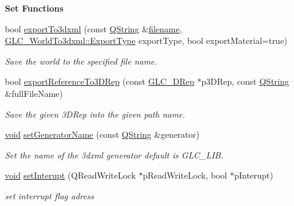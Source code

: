 \begin{Indent}{\bf Set Functions}\par
\begin{DoxyCompactItemize}
\item 
bool \hyperlink{class_g_l_c___world_to3dxml_afc36c19b69c9afedb9d76f64194a0282}{export\-To3dxml} (const \hyperlink{group___u_a_v_objects_plugin_gab9d252f49c333c94a72f97ce3105a32d}{Q\-String} \&\hyperlink{ioapi_8h_a7a03a664b090ce5c848ecb31cb4a2fa8}{filename}, \hyperlink{class_g_l_c___world_to3dxml_a00bd3e3fded597cda87766c5a2e12b96}{G\-L\-C\-\_\-\-World\-To3dxml\-::\-Export\-Type} export\-Type, bool export\-Material=true)
\begin{DoxyCompactList}\small\item\em Save the world to the specified file name. \end{DoxyCompactList}\item 
bool \hyperlink{class_g_l_c___world_to3dxml_adbe0c8eb2c72e142ee5f3491f92fca6f}{export\-Reference\-To3\-D\-Rep} (const \hyperlink{class_g_l_c__3_d_rep}{G\-L\-C\-\_\-D\-Rep} $\ast$p3\-D\-Rep, const \hyperlink{group___u_a_v_objects_plugin_gab9d252f49c333c94a72f97ce3105a32d}{Q\-String} \&full\-File\-Name)
\begin{DoxyCompactList}\small\item\em Save the given 3\-D\-Rep into the given path name. \end{DoxyCompactList}\item 
\hyperlink{group___u_a_v_objects_plugin_ga444cf2ff3f0ecbe028adce838d373f5c}{void} \hyperlink{class_g_l_c___world_to3dxml_a9d284f8dfc24e8d7bc64c27631dab23f}{set\-Generator\-Name} (const \hyperlink{group___u_a_v_objects_plugin_gab9d252f49c333c94a72f97ce3105a32d}{Q\-String} \&generator)
\begin{DoxyCompactList}\small\item\em Set the name of the 3dxml generator default is G\-L\-C\-\_\-\-L\-I\-B. \end{DoxyCompactList}\item 
\hyperlink{group___u_a_v_objects_plugin_ga444cf2ff3f0ecbe028adce838d373f5c}{void} \hyperlink{class_g_l_c___world_to3dxml_a4ae09d476cb928aea32a86036fe6cff9}{set\-Interupt} (Q\-Read\-Write\-Lock $\ast$p\-Read\-Write\-Lock, bool $\ast$p\-Interupt)
\begin{DoxyCompactList}\small\item\em set interrupt flag adress \end{DoxyCompactList}\end{DoxyCompactItemize}
\end{Indent}


